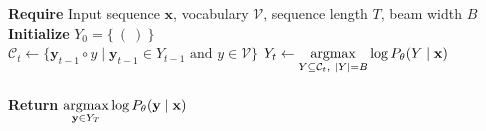 \def\NoNumber#1{{\def\alglinenumber##1{}\STATE #1}\addtocounter{ALG@line}{-1}}

{\centering
\begin{minipage}{\linewidth}
  \begin{algorithm}[H]
    \caption{Beam search}
    \label{alg:beam}
    \begin{algorithmic}[1]
    \STATE \textbf{Require} Input sequence $\mathbf{x}$, vocabulary $\mathcal{V}$, sequence length $T$, beam width $B$ \\
    \STATE \textbf{Initialize} $Y_0 = \{~(~)~\}$ \\
        \STATE $\mathcal{C}_t \gets \{
            \mathbf{y}_{t-1} \circ y \mid 
            \mathbf{y}_{t-1} \in Y_{t-1} \text{~and~} y \in \mathcal{V}
        \}$ \hspace{0.75cm}\small{\color{gray}}
        \STATE $Y_{t} \gets \operatorname*{argmax}\limits_{
            Y \subseteq \mathcal{C}_t, ~|Y| = B
        }{
            \log P_\theta(Y \mid \mathbf{x})
        }$ \hspace{1.5cm}\small{} \\
    \ENDFOR \\
    \STATE \textbf{Return} $\operatorname*{argmax}\limits_{\mathbf{y} \in Y_T}{\log P_\theta(\mathbf{y} \mid \mathbf{x})}$
    \end{algorithmic}
  \end{algorithm}
\end{minipage}
}
